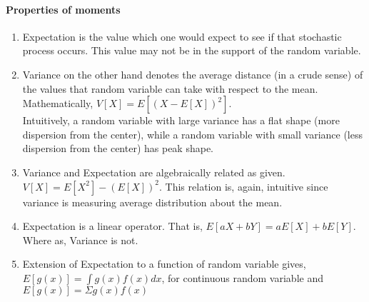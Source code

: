 \documentclass[12pt]{report} %
\begin{document}
	\paragraph*{Properties of moments}
	\begin{enumerate}
	\item Expectation is the value which one would expect to see if that stochastic process occurs. This value may not be in the support of the random variable.
	\item Variance on the other hand denotes the average distance (in a crude sense) of the values that random variable can take with respect to the mean. Mathematically, $V[X] = E[(X- E[X])^2]$.\\
	Intuitively, a random variable with large variance has a flat shape (more dispersion from the center), while a random variable with small variance (less dispersion from the center) has peak shape.
	\item Variance and Expectation are algebraically related as given. $V[X] = E[X^2] - (E[X])^2$. This relation is, again, intuitive since variance is measuring average distribution about the mean. 
	\item Expectation is a linear operator. That is, $E[aX+bY] = aE[X] + bE[Y]$. Where as, Variance is not. 
	\item Extension of Expectation to a function of random variable gives, $E[g(x)] = \int g(x)f(x)dx$, for continuous random variable and $E[g(x)] = \Sigma g(x)f(x)$
	\end{enumerate}
	
	
\end{document}

